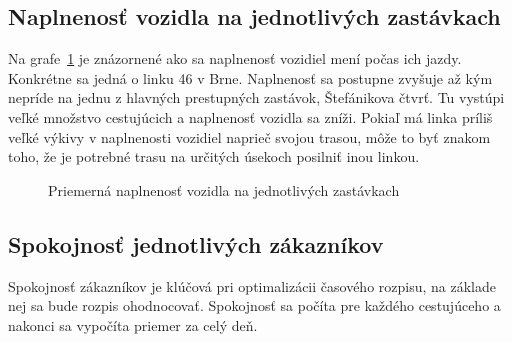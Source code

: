 \subsection*{Naplnenosť vozidla na jednotlivých zastávkach}
Na grafe~\ref{fig:averageLoad} je znázornené ako sa naplnenosť vozidiel mení počas ich jazdy.
Konkrétne sa jedná o linku 46 v Brne.
Naplnenosť sa postupne zvyšuje až kým nepríde na jednu z hlavných prestupných zastávok, Štefánikova čtvrť.
Tu vystúpi veľké množstvo cestujúcich a naplnenosť vozidla sa zníži.
Pokiaľ má linka príliš veľké výkivy v naplnenosti vozidiel naprieč svojou trasou, môže to byť znakom toho, že je potrebné trasu na určitých úsekoch posilniť inou linkou.
\begin{figure}[h]\label{fig:averageLoad}
  \centering
  \caption{Priemerná naplnenosť vozidla na jednotlivých zastávkach}
\end{figure}

\subsection*{Spokojnosť jednotlivých zákazníkov}
Spokojnosť zákazníkov je klúčová pri optimalizácii časového rozpisu, na základe nej sa bude rozpis ohodnocovať.
Spokojnosť sa počíta pre každého cestujúceho a nakonci sa vypočíta priemer za celý deň.

